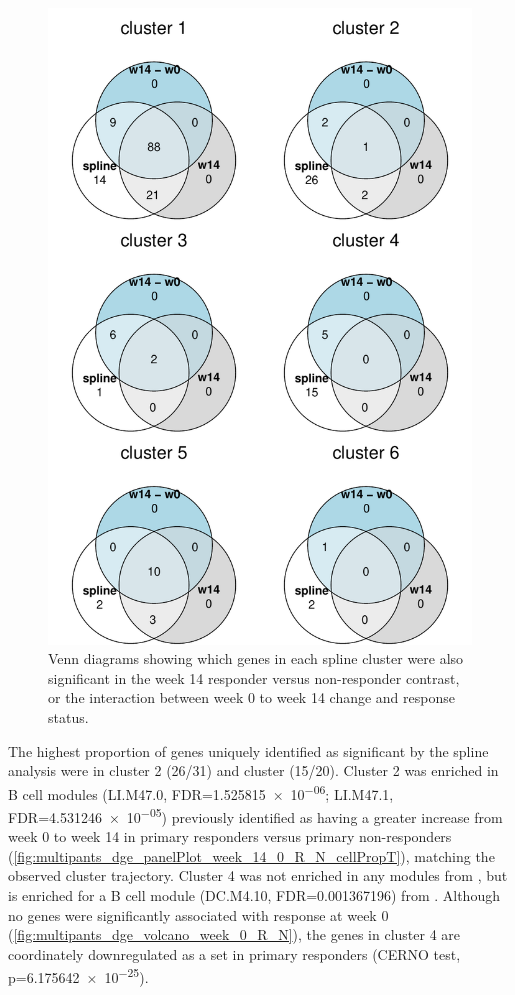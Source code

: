 \begin{figure}
    \centering
    \includegraphics[width=1.0\textwidth,page=1]{mainmatter/figures/chapter_04/plot_gene_set_enrichment.spline_cluster_venns.pdf}
    \caption{Venn diagrams showing which genes in each spline cluster were also significant in the week 14 responder versus non-responder contrast, or the interaction between week 0 to week 14 change and response status.}
    \label{fig:plot_gene_set_enrichment.spline_cluster_venns.pdf}
\end{figure}

The highest proportion of genes uniquely identified as significant by the spline analysis were in cluster 2 (26/31) and cluster (15/20).
Cluster 2 was enriched in \autocite{li2013MolecularSignaturesAntibody} B cell modules (LI.M47.0, FDR=\num{1.525815e-06}; LI.M47.1, FDR=\num{4.531246e-05})
previously identified as having a greater increase from week 0 to week 14 in primary responders versus primary non-responders (\autoref{fig:multipants_dge_panelPlot_week_14_0_R_N_cellPropT}),
matching the observed cluster trajectory.
Cluster 4 was not enriched in any modules from \textcite{li2013MolecularSignaturesAntibody}, but is enriched for a B cell module (DC.M4.10, FDR=\num{0.001367196}) from \textcite{chaussabel2008ModularAnalysisFramework}.
Although no genes were significantly associated with response at week 0 (\autoref{fig:multipants_dge_volcano_week_0_R_N}),
the genes in cluster 4 are coordinately downregulated as a set in primary responders (CERNO test, p=\num{6.175642e-25}).

